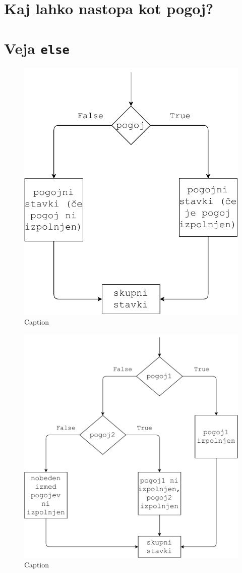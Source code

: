 \section{Kaj lahko nastopa kot pogoj?}

\section{Veja \texttt{else}}


\begin{figure}
    \centering
    \includegraphics[width=0.5\linewidth]{img/if2.pdf}
    \caption{Caption}
    \label{img:if2}
\end{figure}

\begin{figure}
    \centering
    \includegraphics[width=0.65\linewidth]{img/if3.pdf}
    \caption{Caption}
    \label{img:if3}
\end{figure}

